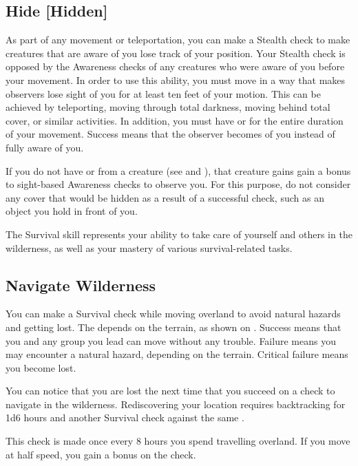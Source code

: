     \subsection{Hide [Hidden]}
        As part of any movement or teleportation, you can make a Stealth check to make creatures that are aware of you lose track of your position.
        Your Stealth check is opposed by the Awareness checks of any creatures who were aware of you before your movement.
        In order to use this ability, you must move in a way that makes observers lose sight of you for at least ten feet of your motion.
        This can be achieved by teleporting, moving through total darkness, moving behind total cover, or similar activities.
        In addition, you must have  or  for the entire duration of your movement.
        Success means that the observer becomes \partiallyunaware of you instead of fully aware of you.

        If you do not have  or  from a creature (see  and ), that creature gains gain a  bonus to sight-based Awareness checks to observe you.
        For this purpose, do not consider any cover that would be hidden as a result of a successful check, such as an object you hold in front of you.

\newpage
{}
        The Survival skill represents your ability to take care of yourself and others in the wilderness, as well as your mastery of various survival-related tasks.

    \subsection{Navigate Wilderness}
        You can make a Survival check while moving overland to avoid natural hazards and getting lost. The  depends on the terrain, as shown on . Success means that you and any group you lead can move without any trouble. Failure means you may encounter a natural hazard, depending on the terrain. Critical failure means you become lost.

        You can notice that you are lost the next time that you succeed on a check to navigate in the wilderness. Rediscovering your location requires backtracking for 1d6 hours and another Survival check against the same \@.

        This check is made once every 8 hours you spend travelling overland. If you move at half speed, you gain a  bonus on the check.


